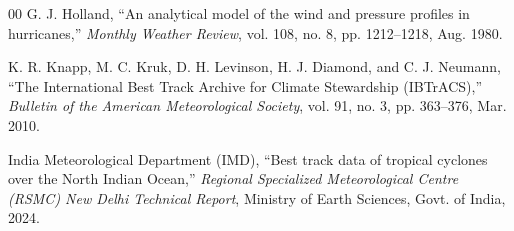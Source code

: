 \documentclass[conference]{IEEEtran}
\begin{document}
\begin{thebibliography}{00}
G. J. Holland,
``An analytical model of the wind and pressure profiles in hurricanes,''
\textit{Monthly Weather Review}, vol. 108, no. 8, pp. 1212--1218, Aug. 1980.

K. R. Knapp, M. C. Kruk, D. H. Levinson, H. J. Diamond, and C. J. Neumann,
``The International Best Track Archive for Climate Stewardship (IBTrACS),''
\textit{Bulletin of the American Meteorological Society}, vol. 91, no. 3, pp. 363--376, Mar. 2010.

India Meteorological Department (IMD),
``Best track data of tropical cyclones over the North Indian Ocean,''
\textit{Regional Specialized Meteorological Centre (RSMC) New Delhi Technical Report}, Ministry of Earth Sciences, Govt. of India, 2024.

\end{thebibliography}
\end{document}
